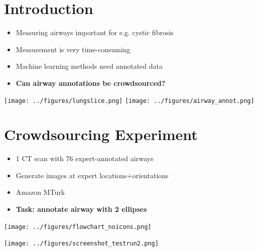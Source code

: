 \documentclass[a4paper,11pt]{article}
\begin{document}
\begin{slidetop}
\begin{multicols}{2}

\section*{Introduction}

\begin{itemize}
\item Measuring airways important for e.g. cystic fibrosis
\item Measurement is very time-consuming
\item Machine learning methods need annotated data
\item \textbf{Can airway annotations be crowdsourced?}
\end{itemize}

\begin{center}
\texttt{[image: ../figures/lungslice.png]}
\texttt{[image: ../figures/airway\_annot.png]}
\label{fig:airway}
\end{center}


\section*{Crowdsourcing Experiment}

\begin{itemize}
\item 1 CT scan with 76 expert-annotated airways
\item Generate images at expert locations+orientations
\item Amazon MTurk
\item \textbf{Task: annotate airway with 2 ellipses}
\end{itemize}


\begin{center}
\texttt{[image: ../figures/flowchart\_noicons.png]}
\label{fig:overview}
\end{center}


\begin{center}
\texttt{[image: ../figures/screenshot\_testrun2.png]}
\label{fig:instr}
\end{center}




\end{multicols}
\end{slidetop}
\end{document}
